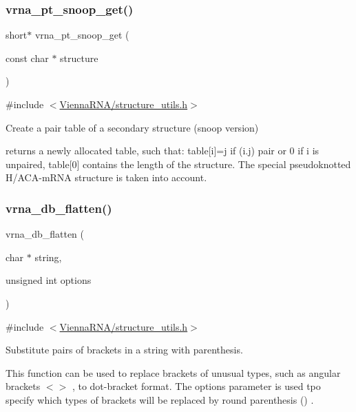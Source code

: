 \subsubsection{\texorpdfstring{vrna\+\_\+pt\+\_\+snoop\+\_\+get()}{vrna\_pt\_snoop\_get()}}
{\footnotesize\ttfamily short$\ast$ vrna\+\_\+pt\+\_\+snoop\+\_\+get (\begin{DoxyParamCaption}\item[{const char $\ast$}]{structure }\end{DoxyParamCaption})}



{\ttfamily \#include $<$\hyperlink{structure__utils_8h}{Vienna\+R\+N\+A/structure\+\_\+utils.\+h}$>$}



Create a pair table of a secondary structure (snoop version) 

returns a newly allocated table, such that\+: table\mbox{[}i\mbox{]}=j if (i.\+j) pair or 0 if i is unpaired, table\mbox{[}0\mbox{]} contains the length of the structure. The special pseudoknotted H/\+A\+C\+A-\/m\+R\+NA structure is taken into account. \mbox{\label{group__struct__utils_gae966b9f44168a4f4b39ca42ffb5f37b7}} 
\subsubsection{\texorpdfstring{vrna\+\_\+db\+\_\+flatten()}{vrna\_db\_flatten()}}
{\footnotesize\ttfamily vrna\+\_\+db\+\_\+flatten (\begin{DoxyParamCaption}\item[{char $\ast$}]{string,  }\item[{unsigned int}]{options }\end{DoxyParamCaption})}



{\ttfamily \#include $<$\hyperlink{structure__utils_8h}{Vienna\+R\+N\+A/structure\+\_\+utils.\+h}$>$}



Substitute pairs of brackets in a string with parenthesis. 

This function can be used to replace brackets of unusual types, such as angular brackets  $<$$>$  , to dot-\/bracket format. The {\ttfamily options} parameter is used tpo specify which types of brackets will be replaced by round parenthesis  () .

